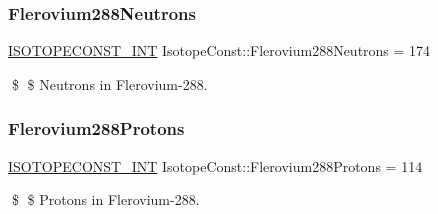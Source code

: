 \subsubsection{\texorpdfstring{Flerovium288\+Neutrons}{Flerovium288Neutrons}}
{\footnotesize\ttfamily \mbox{\hyperlink{group___isotope_const-_macros_ga5f18360b3e99483a35c32d789e62621c}{I\+S\+O\+T\+O\+P\+E\+C\+O\+N\+S\+T\+\_\+\+I\+NT}} Isotope\+Const\+::\+Flerovium288\+Neutrons = 174}

\$ \$ Neutrons in Flerovium-\/288. \mbox{\label{group___isotope_const-_flerovium-_fl288_ga2517ce87f5f3847c226aaee084af9ddc}} 
\subsubsection{\texorpdfstring{Flerovium288\+Protons}{Flerovium288Protons}}
{\footnotesize\ttfamily \mbox{\hyperlink{group___isotope_const-_macros_ga5f18360b3e99483a35c32d789e62621c}{I\+S\+O\+T\+O\+P\+E\+C\+O\+N\+S\+T\+\_\+\+I\+NT}} Isotope\+Const\+::\+Flerovium288\+Protons = 114}

\$ \$ Protons in Flerovium-\/288. 